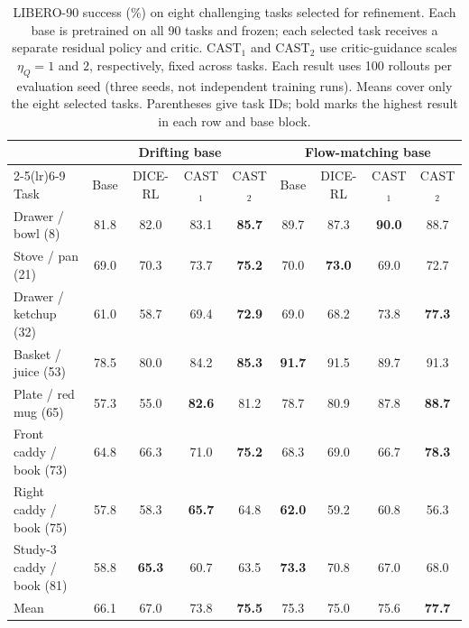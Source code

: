 \begin{table}[t]
\centering
\caption{LIBERO-90 success (\%) on eight challenging tasks selected for
refinement. Each base is pretrained on all 90 tasks and frozen; each
selected task receives a separate residual policy and critic. CAST$_1$
and CAST$_2$ use critic-guidance scales $\eta_Q=1$ and $2$, respectively,
fixed across tasks. Each result uses 100 rollouts per evaluation seed
(three seeds, not independent training runs). Means cover only the eight
selected tasks. Parentheses give task IDs; bold marks the highest result
in each row and base block.}
\label{tab:libero-main}
\small
\begin{tabular*}{\textwidth}{@{\extracolsep{\fill}}lcccccccc@{}}
\toprule
 & \multicolumn{4}{c}{Drifting base} & \multicolumn{4}{c}{Flow-matching base} \\
\cmidrule(lr){2-5}\cmidrule(lr){6-9}
Task & Base & DICE-RL & CAST$_1$ & CAST$_2$ & Base & DICE-RL & CAST$_1$ & CAST$_2$ \\
\midrule
Drawer / bowl (8) & 81.8 & 82.0 & 83.1 & \textbf{85.7} & 89.7 & 87.3 & \textbf{90.0} & 88.7 \\
Stove / pan (21) & 69.0 & 70.3 & 73.7 & \textbf{75.2} & 70.0 & \textbf{73.0} & 69.0 & 72.7 \\
Drawer / ketchup (32) & 61.0 & 58.7 & 69.4 & \textbf{72.9} & 69.0 & 68.2 & 73.8 & \textbf{77.3} \\
Basket / juice (53) & 78.5 & 80.0 & 84.2 & \textbf{85.3} & \textbf{91.7} & 91.5 & 89.7 & 91.3 \\
Plate / red mug (65) & 57.3 & 55.0 & \textbf{82.6} & 81.2 & 78.7 & 80.9 & 87.8 & \textbf{88.7} \\
Front caddy / book (73) & 64.8 & 66.3 & 71.0 & \textbf{75.2} & 68.3 & 69.0 & 66.7 & \textbf{78.3} \\
Right caddy / book (75) & 57.8 & 58.3 & \textbf{65.7} & 64.8 & \textbf{62.0} & 59.2 & 60.8 & 56.3 \\
Study-3 caddy / book (81) & 58.8 & \textbf{65.3} & 60.7 & 63.5 & \textbf{73.3} & 70.8 & 67.0 & 68.0 \\
\midrule
Mean & 66.1 & 67.0 & 73.8 & \textbf{75.5} & 75.3 & 75.0 & 75.6 & \textbf{77.7} \\
\bottomrule
\end{tabular*}
\end{table}
